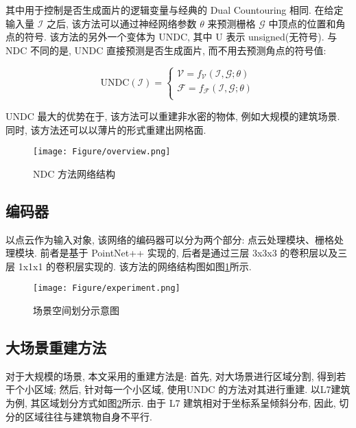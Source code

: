 其中用于控制是否生成面片的逻辑变量与经典的 Dual Countouring 相同. 在给定输入量 $\mathcal{I}$ 之后, 该方法可以通过神经网络参数 $\theta$ 来预测栅格 $\mathcal{G}$ 中顶点的位置和角点的符号. 
该方法的另外一个变体为 UNDC, 其中 U 表示 unsigned(无符号). 与 NDC 不同的是, UNDC 直接预测是否生成面片, 而不用去预测角点的符号值: 

\begin{equation}
    \mathrm{UNDC}(\mathcal{I}) =
		\begin{cases}
			\mathcal{V} = f_{\mathcal{V}}(\mathcal{I,G};\theta) \\
			\mathcal{F} = f_{\mathcal{F}}(\mathcal{I,G};\theta) \\
		\end{cases}
\end{equation}

UNDC 最大的优势在于, 该方法可以重建非水密的物体, 例如大规模的建筑场景. 同时, 该方法还可以以薄片的形式重建出网格面. 

\begin{figure}[H]
	\center
	\texttt{[image: Figure/overview.png]}
	\centering
	\caption{NDC 方法网络结构}\label{fig:fig-net}
\end{figure}

\subsection{编码器}

以点云作为输入对象, 该网络的编码器可以分为两个部分: 点云处理模块、栅格处理模块. 
前者是基于 PointNet++\cite{qi2017pointnet++} 实现的, 后者是通过三层 3x3x3 的卷积层以及三层 1x1x1 的卷积层实现的. 该方法的网络结构图如图\ref{fig:fig-net}所示. 

\begin{figure}[H]
	\center
	\texttt{[image: Figure/experiment.png]}
	\centering
	\caption{场景空间划分示意图}\label{fig:fig-seg}
\end{figure}

\subsection{大场景重建方法}

对于大规模的场景, 本文采用的重建方法是: 
首先, 对大场景进行区域分割, 得到若干个小区域; 
然后, 针对每一个小区域, 使用UNDC 的方法对其进行重建. 
以L7建筑为例, 其区域划分方式如图\ref{fig:fig-seg}所示. 由于 L7 建筑相对于坐标系呈倾斜分布, 因此, 切分的区域往往与建筑物自身不平行. 


